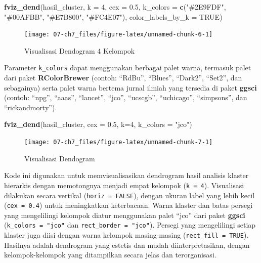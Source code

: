 \documentclass[
  oneside]{book}
\newenvironment{Shaded}{\begin{snugshade}}{\end{snugshade}}
\newcommand{\AttributeTok}[1]{\textcolor[rgb]{0.13,0.29,0.53}{#1}}
\newcommand{\ConstantTok}[1]{\textcolor[rgb]{0.56,0.35,0.01}{#1}}
\newcommand{\DecValTok}[1]{\textcolor[rgb]{0.00,0.00,0.81}{#1}}
\newcommand{\FloatTok}[1]{\textcolor[rgb]{0.00,0.00,0.81}{#1}}
\newcommand{\FunctionTok}[1]{\textcolor[rgb]{0.13,0.29,0.53}{\textbf{#1}}}
\newcommand{\NormalTok}[1]{#1}
\newcommand{\StringTok}[1]{\textcolor[rgb]{0.31,0.60,0.02}{#1}}
\begin{document}
\begin{Shaded}
\begin{Highlighting}[]
\FunctionTok{fviz\_dend}\NormalTok{(hasil\_cluster, }
          \AttributeTok{k =} \DecValTok{4}\NormalTok{,}
          \AttributeTok{cex =} \FloatTok{0.5}\NormalTok{, }
          \AttributeTok{k\_colors =} \FunctionTok{c}\NormalTok{(}\StringTok{"\#2E9FDF"}\NormalTok{, }\StringTok{"\#00AFBB"}\NormalTok{, }\StringTok{"\#E7B800"}\NormalTok{, }\StringTok{"\#FC4E07"}\NormalTok{), }
          \AttributeTok{color\_labels\_by\_k =} \ConstantTok{TRUE}\NormalTok{)}
\end{Highlighting}
\end{Shaded}

\begin{figure}[h]

{\centering \texttt{[image: 07-ch7\_files/figure-latex/unnamed-chunk-6-1]} 

}

\caption{Visualisasi Dendogram 4 Kelompok}\label{fig:unnamed-chunk-6}
\end{figure}

Parameter \texttt{k\_colors} dapat menggunakan berbagai palet warna, termasuk palet dari paket \textbf{RColorBrewer} (contoh: ``RdBu'', ``Blues'', ``Dark2'', ``Set2'', dan sebagainya) serta palet warna bertema jurnal ilmiah yang tersedia di paket \textbf{ggsci} (contoh: ``npg'', ``aaas'', ``lancet'', ``jco'', ``ucscgb'', ``uchicago'', ``simpsons'', dan ``rickandmorty'').

\begin{Shaded}
\begin{Highlighting}[]
\FunctionTok{fviz\_dend}\NormalTok{(hasil\_cluster, }\AttributeTok{cex =} \FloatTok{0.5}\NormalTok{, }\AttributeTok{k=}\DecValTok{4}\NormalTok{,}
\AttributeTok{k\_colors =} \StringTok{"jco"}\NormalTok{)}
\end{Highlighting}
\end{Shaded}

\begin{figure}[h]

{\centering \texttt{[image: 07-ch7\_files/figure-latex/unnamed-chunk-7-1]} 

}

\caption{Visualisasi Dendogram}\label{fig:unnamed-chunk-7}
\end{figure}

Kode ini digunakan untuk memvisualisasikan dendrogram hasil analisis klaster hierarkis dengan memotongnya menjadi empat kelompok (\texttt{k\ =\ 4}). Visualisasi dilakukan secara vertikal (\texttt{horiz\ =\ FALSE}), dengan ukuran label yang lebih kecil (\texttt{cex\ =\ 0.4}) untuk meningkatkan keterbacaan. Warna klaster dan batas persegi yang mengelilingi kelompok diatur menggunakan palet ``jco'' dari paket \textbf{ggsci} (\texttt{k\_colors\ =\ "jco"} dan \texttt{rect\_border\ =\ "jco"}). Persegi yang mengelilingi setiap klaster juga diisi dengan warna kelompok masing-masing (\texttt{rect\_fill\ =\ TRUE}). Hasilnya adalah dendrogram yang estetis dan mudah diinterpretasikan, dengan kelompok-kelompok yang ditampilkan secara jelas dan terorganisasi.
\end{document}
